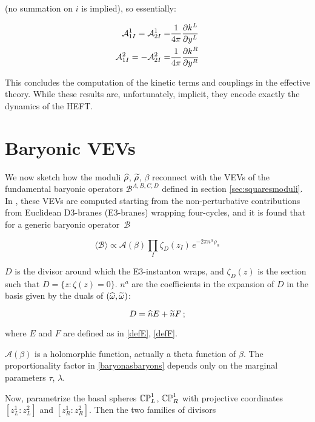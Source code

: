 (no summation on $i$ is implied), so essentially:

\begin{align}
	\mathcal{A}_{1I}^1 = \mathcal{A}_{2I}^1 = & \frac{1}{4\pi} \frac{\partial k^L}{\partial y^L} \\
	\mathcal{A}_{1I}^2 = - \mathcal{A}_{2I}^2 = & \frac{1}{4\pi} \frac{\partial k^R}{\partial y^R} 
	\label{}
\end{align}

This concludes the computation of the kinetic terms and couplings in the effective theory. While these results are, unfortunately, implicit, they encode exactly the dynamics of the HEFT.

\section{Baryonic VEVs}

We now sketch how the moduli $\widehat{\rho}$, $\widetilde{\rho}$, $\beta$ reconnect with the VEVs of the fundamental baryonic operators $\mathcal{B}^{A,B,C,D}$ defined in section \ref{sec:squaresmoduli}. In \cite{MZ}, these VEVs are computed starting from the non-perturbative contributions from Euclidean D3-branes (E3-branes) wrapping four-cycles, and it is found that for a generic baryonic o\-pe\-ra\-tor~$\mathcal{B}$

\begin{equation}
	\langle \mathcal{B} \rangle \propto \mathcal{A}(\beta) \prod_I \zeta_D(z_I) \, e^{-2\pi n^\alpha \rho_\alpha}
	\label{baryonasbaryons}
\end{equation}

$D$ is the divisor around which the E3-instanton wraps, and $\zeta_D(z)$ is the section such that $D = \{z :  \zeta(z) = 0\}$. $n^a$ are the coefficients in the expansion of $D$ in the basis given by the duals of $(\widehat{\omega},\widetilde{\omega})$:

\begin{equation}
	D = \widehat{n} E + \widetilde{n} F\,;
	\label{}
\end{equation}

where $E$ and $F$ are defined as in \eqref{defE}, \eqref{defF}.

$\mathcal{A}(\beta)$ is a holomorphic function, actually a theta function of $\beta$. The proportionality factor in \eqref{baryonasbaryons} depends only on the marginal parameters $\tau$, $\lambda$.

Now, parametrize the basal spheres $\mathbb{CP}^1_L$, $\mathbb{CP}^1_R$ with projective coordinates $[z_L^1 : z_L^2]$ and $[z_R^1 : z_R^2]$. Then the two families of divisors


